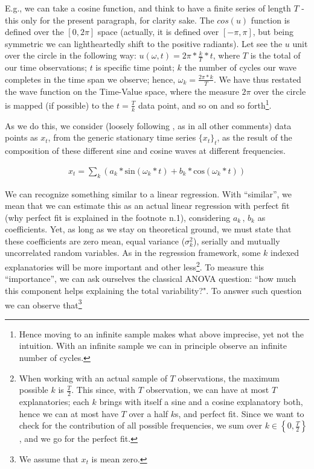 \documentclass[12pt]{article} %
\begin{document}
E.g., we can take a cosine function, and think to have a finite series of length $T$ - this only for the present paragraph, for clarity sake. The $cos(u)$ function is defined over the $[0,2\pi]$ space (actually, it is defined over $[-\pi,\pi]$, but being symmetric we can lightheartedly shift to the positive radiants). Let see the $u$ unit over the circle in the following way: $u(\omega, t)=2\pi*\frac{k}{T}*t$, where $T$ is the total of our time observations; $t$ is specific time point; $k$ the number of cycles our wave completes in the time span we observe; hence, $\omega_k=\frac{2\pi*k}{T}$.  We have thus restated the wave function on the Time-Value space, where the measure $2\pi$ over the circle is mapped (if possible) to the $t=\frac{T}{k}$ data point, and so on and so forth\footnote{
Hence moving to an infinite sample makes what above imprecise, yet not the intuition. With an infinite sample we can in principle observe an infinite number of cycles.}.

As we do this, we consider (loosely following \citet{hammy}, as in all other comments) data points as $x_t$, from the generic stationary time series $\{x_t\}_t$, as the result of the composition of these different sine and cosine waves at different frequencies. 

\begin{equation}
\begin{aligned}
x_t=\sum_k(a_k*\text{sin}(\omega_k*t)+b_k*\text{cos}(\omega_k*t))
\end{aligned}
\end{equation}

We can recognize something similar to a linear regression.
With ``similar'', we mean that we can estimate this as an actual linear regression with perfect fit (why perfect fit is explained in the footnote n.1), considering $a_k\,,\,b_k$ as coefficients. Yet, as long as we stay on theoretical ground, we must state that these coefficients are zero mean, equal variance ($\sigma_k^2$), serially and mutually uncorrelated random variables. As in the regression framework, some $k$ indexed explanatories will be more important and other less\footnote{
When working with an actual sample of $T$ observations, the maximum possible $k$ is $\frac{T}{2}$. This since, with $T$ observation, we can have at most $T$ explanatories; each $k$ brings with itself a sine and a cosine explanatory both, hence we can at most have $T$ over a half $k$s, and perfect fit. Since we want to check for the contribution of all possible frequencies, we sum over $k\in\left\{0,\frac{T}{2}\right\}$, and we go for the perfect fit.}. To measure this ``importance'', we can ask ourselves the classical ANOVA question: ``how much this component helps explaining the total variability?". To answer such question we can observe that\footnote{We assume that $x_t$ is mean zero.}
\end{document}
